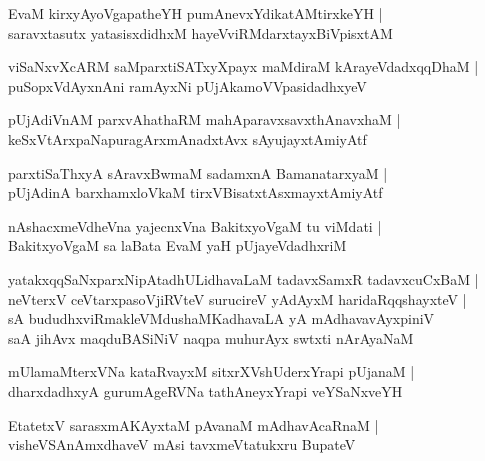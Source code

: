 \documentclass[twoside,12pt,openright]{book}
\newcounter{shloka}[chapter]
\begin{document}
\begin{shloka}%
EvaM kirxyAyoVgapatheYH pumAnevxYdikatAMtirxkeYH |\\
saravxtasutx yatasisxdidhxM hayeVviRMdarxtayxBiVpisxtAM 
\end{shloka}

\begin{shloka}%
viSaNxvXcARM saMparxtiSATxyXpayx maMdiraM kArayeVdadxqqDhaM |\\
puSopxVdAyxnAni ramAyxNi pUjAkamoVVpasidadhxyeV 
\end{shloka}

\begin{shloka}%
pUjAdiVnAM parxvAhathaRM mahAparavxsavxthAnavxhaM |\\
keSxVtArxpaNapuragArxmAnadxtAvx sAyujayxtAmiyAtf
\end{shloka}

\begin{shloka}%
parxtiSaThxyA sAravxBwmaM sadamxnA BamanatarxyaM |\\
pUjAdinA barxhamxloVkaM tirxVBisatxtAsxmayxtAmiyAtf
\end{shloka}

\begin{shloka}%
nAshacxmeVdheVna yajecnxVna BakitxyoVgaM tu viMdati |\\
BakitxyoVgaM sa laBata EvaM yaH pUjayeVdadhxriM 
\end{shloka}

\begin{shloka}%
yatakxqqSaNxparxNipAtadhULidhavaLaM tadavxSamxR tadavxcuCxBaM |\\
neVterxV ceVtarxpasoVjiRVteV surucireV yAdAyxM haridaRqqshayxteV |\\
sA bududhxviRmakleVMdushaMKadhavaLA yA mAdhavavAyxpiniV \\
saA jihAvx maqduBASiNiV naqpa muhurAyx swtxti nArAyaNaM 
\end{shloka}

\begin{shloka}%
mUlamaMterxVNa kataRvayxM sitxrXVshUderxYrapi pUjanaM |\\
dharxdadhxyA gurumAgeRVNa tathAneyxYrapi veYSaNxveYH
\end{shloka}

\begin{shloka}%
EtatetxV sarasxmAKAyxtaM pAvanaM mAdhavAcaRnaM |\\
visheVSAnAmxdhaveV mAsi tavxmeVtatukxru BupateV 
\end{shloka}
\end{document}
